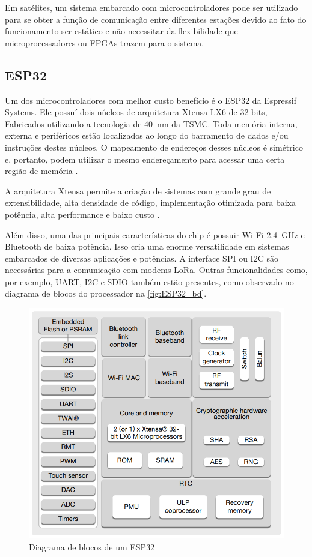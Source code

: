 \documentclass[
	12pt,				%
	openright,			%
	twoside,			%
	a4paper,			%
	english,			%
	french,				%
	spanish,			%
	brazil				%
	]{abntex2}
\begin{document}
Em satélites, um sistema embarcado com microcontroladores pode ser utilizado para se obter a função de comunicação entre diferentes estações devido ao fato do funcionamento ser estático e não necessitar da flexibilidade que microprocessadores ou FPGAs trazem para o sistema.

\subsection{ESP32}

Um dos microcontroladores com melhor custo benefício é o ESP32 da Espressif Systems. Ele possuí dois núcleos de arquitetura Xtensa LX6 de 32-bits, Fabricados utilizando a tecnologia de \SI{40}{\nano\meter} da TSMC. Toda memória interna, externa e periféricos estão localizados ao longo do barramento de dados e/ou instruções destes núcleos. O mapeamento de endereços desses núcleos é simétrico e, portanto, podem utilizar o mesmo endereçamento para acessar uma certa região de memória \cite{esp_trm_2022}.

A arquitetura Xtensa permite a criação de sistemas com grande grau de extensibilidade, alta densidade de código, implementação otimizada para baixa potência, alta performance e baixo custo \cite{xtensa_isa_2022}.

Além disso, uma das principais características do chip é possuir Wi-Fi \SI{2,4}{\giga\hertz} e Bluetooth de baixa potência. Isso cria uma enorme versatilidade em sistemas embarcados de diversas aplicações e potências. A interface SPI ou I2C são necessárias para a comunicação com modems LoRa. Outras funcionalidades como, por exemplo, UART, I2C e SDIO também estão presentes, como observado no diagrama de blocos do processador na \autoref{fig:ESP32_bd}.

\begin{figure}[H]
	\caption{\label{fig:ESP32_bd}Diagrama de blocos de um ESP32}
	\begin{center}
	    \includegraphics[scale=0.5]{img/ESP32_BD.png}
	\end{center}
\end{figure}
\end{document}

